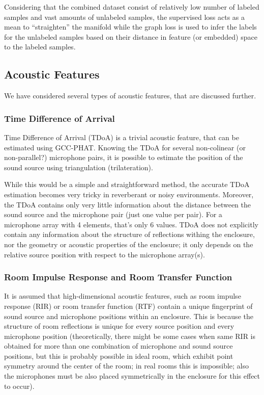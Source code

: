 \documentclass[applsci,article,submit,moreauthors,pdftex]{Definitions/mdpi}
\begin{document}
Considering that the combined dataset consist of relatively low number of labeled samples and vast amounts of unlabeled samples, the supervised loss acts as a mean to ``straighten'' the manifold while the graph loss is used to infer the labels for the unlabeled samples based on their distance in feature (or embedded) space to the labeled samples.


\subsection{Acoustic Features}
We have considered several types of acoustic features, that are discussed further.

\subsubsection{Time Difference of Arrival}
Time Difference of Arrival (TDoA) is a trivial acoustic feature, that can be estimated using GCC-PHAT. Knowing the TDoA for several non-colinear (or non-parallel?) microphone pairs, it is possible to estimate the position of the sound source using triangulation (trilateration).

While this would be a simple and straightforward method, the accurate TDoA estimation becomes very tricky in reverberant or noisy environments. Moreover, the TDoA contains only very little information about the distance between the sound source and the microphone pair (just one value per pair). For a microphone array with 4 elements, that's only 6 values. TDoA does not explicitly contain any information about the structure of reflections withing the enclosure, nor the geometry or acoustic properties of the enclosure; it only depends on the relative source position with respect to the microphone array(s).

\subsubsection{Room Impulse Response and Room Transfer Function}
It is assumed that high-dimensional acoustic features, such as room impulse response (RIR) or room transfer function (RTF) contain a unique fingerprint of sound source and microphone positions within an enclosure. This is because the structure of room reflections is unique for every source position and every microphone position (theoretically, there might be some cases when same RIR is obtained for more than one combination of microphone and sound source positions, but this is probably possible in ideal room, which exhibit point symmetry around the center of the room; in real rooms this is impossible; also the microphones must be also placed symmetrically in the enclosure for this effect to occur).
\end{document}
